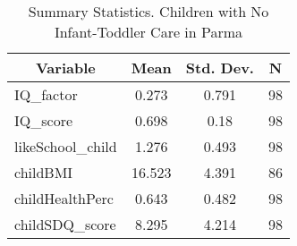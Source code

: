 
\begin{table}[htbp]\centering \caption{Summary Statistics. Children with No Infant-Toddler Care in Parma \label{bothChildasiloNoneParma}}
\begin{tabular}{l c c  c}\hline\hline
\multicolumn{1}{c}{\textbf{Variable}} & \textbf{Mean}
 & \textbf{Std. Dev.} & \textbf{N}\\ \hline
IQ\_factor & 0.273 & 0.791  & 98\\
IQ\_score & 0.698 & 0.18  & 98\\
likeSchool\_child & 1.276 & 0.493  & 98\\
childBMI & 16.523 & 4.391  & 86\\
childHealthPerc & 0.643 & 0.482  & 98\\
childSDQ\_score & 8.295 & 4.214  & 98\\
\hline\end{tabular}
\end{table}

